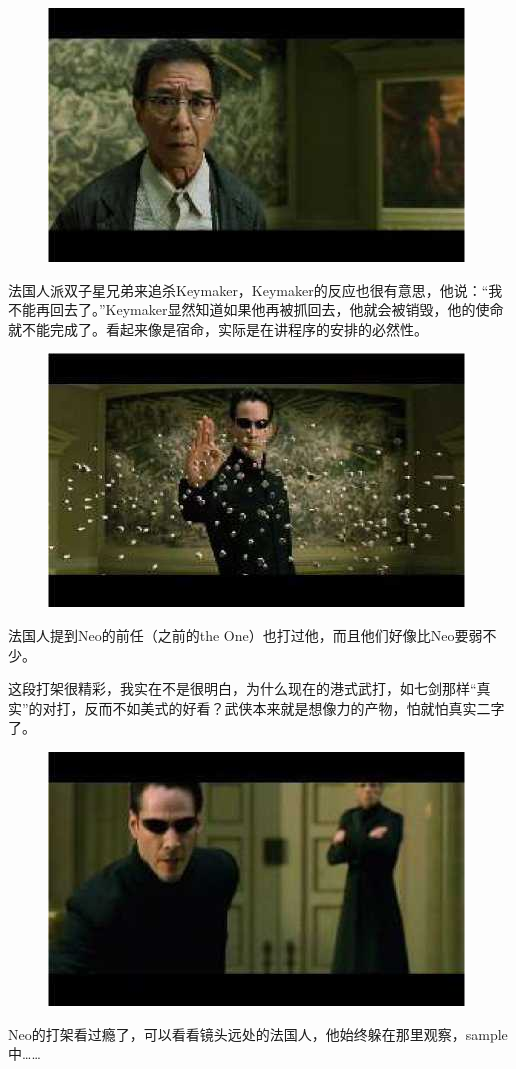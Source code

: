 \documentclass{ctexart}
\begin{document}
\begin{figure}[htb]
\centering
\includegraphics[width=0.5\linewidth]{fig/read_reloaded-119}
\end{figure}

法国人派双子星兄弟来追杀Keymaker，Keymaker的反应也很有意思，他说：“我不能再回去了。”Keymaker显然知道如果他再被抓回去，他就会被销毁，他的使命就不能完成了。看起来像是宿命，实际是在讲程序的安排的必然性。

\begin{figure}[htb]
\centering
\includegraphics[width=0.5\linewidth]{fig/read_reloaded-120}
\end{figure}

法国人提到Neo的前任（之前的the One）也打过他，而且他们好像比Neo要弱不少。

这段打架很精彩，我实在不是很明白，为什么现在的港式武打，如七剑那样“真实”的对打，反而不如美式的好看？武侠本来就是想像力的产物，怕就怕真实二字了。

\begin{figure}[htb]
\centering
\includegraphics[width=0.5\linewidth]{fig/read_reloaded-121}
\end{figure}

Neo的打架看过瘾了，可以看看镜头远处的法国人，他始终躲在那里观察，sample中……
\end{document}
